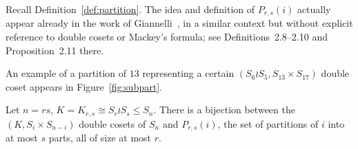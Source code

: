 \documentclass[ALCO,published]{cedram}
\begin{document}
Recall Definition~\ref{def:partition}. 
The idea and definition of $P_{r,s}(i)$ actually appear
already in the work of Giannelli~\cite{Giannelli}, 
in a similar context but without explicit reference to double cosets or Mackey's formula; 
see Definitions~2.8--2.10 and Proposition~2.11 there.

An example of a partition of $13$ representing a certain $(S_6\wr S_5,S_{13}\times S_{17})$ double coset appears in Figure~\ref{fig:subpart}.

\begin{lemma}\label{lemma:parametrization}
    Let $n = rs$, $K = K_{r,s} \cong S_r \wr S_s \le S_n$.
    There is a bijection between the $(K,S_i\times S_{n-i})$ double cosets of $S_n$ and $P_{r,s}(i)$, the set of partitions of $i$ into at most $s$ parts, all of size at most $r$. 
\end{lemma}
\end{document}
